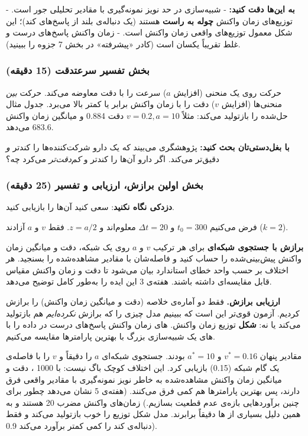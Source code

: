 \textbf{به این‌ها دقت کنید:} - شبیه‌سازی در حد نویز نمونه‌گیری با مقادیر
تحلیلی جور است. - توزیع‌های زمان واکنش \textbf{چوله به راست} هستند (یک
دنباله‌ی بلند از پاسخ‌های کند)؛ این شکل معمول توزیع‌های واقعی زمان واکنش
است. - زمان واکنش پاسخ‌های درست و غلط تقریباً یکسان است (کادر «پیشرفته» در
بخش 7 جزوه را ببینید).

\subsubsection{\texorpdfstring{بخش  تفسیر 
سرعت\lr{--}دقت (15 دقیقه)}{بخش D: تفسیر trade-off سرعت\lr{--}دقت (15 دقیقه)}}

حرکت روی یک منحنی (افزایش \(a\)) سرعت را با دقت معاوضه می‌کند. حرکت
\emph{بین} منحنی‌ها (افزایش \(v\)) دقت را با زمان واکنش برابر یا کمتر
بالا می‌برد. جدول مثال حل‌شده را بازتولید می‌کند: مثلاً \(v = 0.2, a = 10\)
دقت 0.884 و میانگین زمان واکنش 683.6  می‌دهد.

\textbf{با بغل‌دستی‌تان بحث کنید:} پژوهشگری می‌بیند که یک دارو شرکت‌کننده‌ها
را کندتر \emph{و} دقیق‌تر می‌کند. اگر دارو آن‌ها را کندتر و \emph{کم‌دقت‌تر}
می‌کرد چه؟

\subsubsection{\texorpdfstring{بخش  اولین برازش، ارزیابی و تفسیر
(25 دقیقه)}{بخش E: اولین برازش، ارزیابی و تفسیر (25 دقیقه)}}

\textbf{دزدکی نگاه نکنید}: سعی کنید آن‌ها را بازیابی کنید.

فرض می‌کنیم \(t_0 = 300\)  و \(\Delta t = 20\)  معلوم‌اند و
\(z = a/2\). فقط \(v\) و \(a\) آزادند (\(k = 2\)).

\textbf{برازش با جستجوی شبکه‌ای } برای هر ترکیب \(v\)
و \(a\) روی یک شبکه، دقت و میانگین زمان واکنش پیش‌بینی‌شده را حساب کنید و
فاصله‌شان با مقادیر مشاهده‌شده را بسنجید. هر اختلاف بر حسب واحد خطای
استاندارد بیان می‌شود تا دقت و زمان واکنش مقیاس قابل مقایسه‌ای داشته
باشند. هفته‌ی 3 این ایده را به‌طور کامل توضیح می‌دهد.

\textbf{ارزیابی برازش.} فقط دو آماره‌ی خلاصه (دقت و میانگین زمان واکنش)
را برازش کردیم. آزمون قوی‌تر این است که ببینیم مدل چیزی را که برازش
\emph{نکرده‌ایم} هم بازتولید می‌کند یا نه: \textbf{شکل} توزیع زمان واکنش.
های زمان واکنش پاسخ‌های درست در داده را با های
یک شبیه‌سازی بزرگ با بهترین پارامترها مقایسه می‌کنیم.

مقادیر پنهان \(v^\ast = 0.16\) و \(a^\ast = 10\) بودند. جستجوی شبکه‌ای
\(a\) را دقیقاً و \(v\) را با فاصله‌ی یک گام شبکه (0.15) بازیابی کرد. این
اختلاف کوچک باگ نیست: با 1000 ، دقت و میانگین زمان واکنش
مشاهده‌شده به خاطر نویز نمونه‌گیری با مقادیر واقعی فرق دارند، پس بهترین
پارامترها هم کمی فرق می‌کنند. (هفته‌ی 5 نشان می‌دهد چطور برای چنین
برآوردهایی بازه‌ی عدم قطعیت بسازیم.) زمان‌های واکنش مضرب 20  هستند
و به همین دلیل بسیاری از ها دقیقاً برابرند. مدل شکل توزیع را
خوب بازتولید می‌کند و فقط دنباله‌ی کند را کمی کمتر برآورد می‌کند
 0.9).

